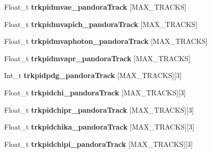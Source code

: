 \begin{DoxyCompactItemize}
\item 
\hypertarget{classanatree_a3ec8db7dd8d43370ee8cbf7c07653968}{Float\-\_\-t {\bfseries trkpidmvae\-\_\-pandora\-Track} \mbox{[}M\-A\-X\-\_\-\-T\-R\-A\-C\-K\-S\mbox{]}}\label{classanatree_a3ec8db7dd8d43370ee8cbf7c07653968}

\item 
\hypertarget{classanatree_a19da3d95303f59672c123ed72a8bd0e3}{Float\-\_\-t {\bfseries trkpidmvapich\-\_\-pandora\-Track} \mbox{[}M\-A\-X\-\_\-\-T\-R\-A\-C\-K\-S\mbox{]}}\label{classanatree_a19da3d95303f59672c123ed72a8bd0e3}

\item 
\hypertarget{classanatree_a4b3f933f34841a84d5a611959596c0b8}{Float\-\_\-t {\bfseries trkpidmvaphoton\-\_\-pandora\-Track} \mbox{[}M\-A\-X\-\_\-\-T\-R\-A\-C\-K\-S\mbox{]}}\label{classanatree_a4b3f933f34841a84d5a611959596c0b8}

\item 
\hypertarget{classanatree_a5463178fd5350de3307da3766ca050ff}{Float\-\_\-t {\bfseries trkpidmvapr\-\_\-pandora\-Track} \mbox{[}M\-A\-X\-\_\-\-T\-R\-A\-C\-K\-S\mbox{]}}\label{classanatree_a5463178fd5350de3307da3766ca050ff}

\item 
\hypertarget{classanatree_a00011e8576a8d5ed7b91a831c7e08f29}{Int\-\_\-t {\bfseries trkpidpdg\-\_\-pandora\-Track} \mbox{[}M\-A\-X\-\_\-\-T\-R\-A\-C\-K\-S\mbox{]}\mbox{[}3\mbox{]}}\label{classanatree_a00011e8576a8d5ed7b91a831c7e08f29}

\item 
\hypertarget{classanatree_afa8d6d92e18f547d1481c2c5bf354e64}{Float\-\_\-t {\bfseries trkpidchi\-\_\-pandora\-Track} \mbox{[}M\-A\-X\-\_\-\-T\-R\-A\-C\-K\-S\mbox{]}\mbox{[}3\mbox{]}}\label{classanatree_afa8d6d92e18f547d1481c2c5bf354e64}

\item 
\hypertarget{classanatree_a627730b2ca665fba61264ea802ff8191}{Float\-\_\-t {\bfseries trkpidchipr\-\_\-pandora\-Track} \mbox{[}M\-A\-X\-\_\-\-T\-R\-A\-C\-K\-S\mbox{]}\mbox{[}3\mbox{]}}\label{classanatree_a627730b2ca665fba61264ea802ff8191}

\item 
\hypertarget{classanatree_aee3b98d0f388fbdd52ddc520b2dbdffd}{Float\-\_\-t {\bfseries trkpidchika\-\_\-pandora\-Track} \mbox{[}M\-A\-X\-\_\-\-T\-R\-A\-C\-K\-S\mbox{]}\mbox{[}3\mbox{]}}\label{classanatree_aee3b98d0f388fbdd52ddc520b2dbdffd}

\item 
\hypertarget{classanatree_ac6e609689ab0d14cc79c56d8a8e439dd}{Float\-\_\-t {\bfseries trkpidchipi\-\_\-pandora\-Track} \mbox{[}M\-A\-X\-\_\-\-T\-R\-A\-C\-K\-S\mbox{]}\mbox{[}3\mbox{]}}\label{classanatree_ac6e609689ab0d14cc79c56d8a8e439dd}


\end{DoxyCompactItemize}
